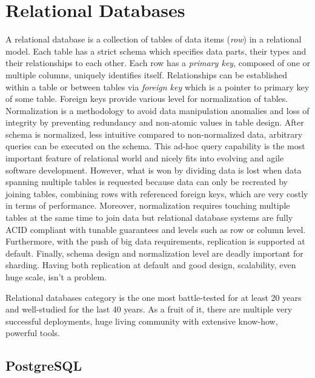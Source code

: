 \section{Relational Databases} 

A relational database is a collection of tables of data items (\textit{row}) in a relational model. Each table has a strict schema which specifies data parts, their types and their relationships to each other. Each row has a \textit{primary key}, composed of one or multiple columns, uniquely identifies itself. Relationships can be established within a table or between tables via \textit{foreign key} which is a pointer to primary key of some table. Foreign keys provide various level for normalization of tables. Normalization is a methodology to avoid data manipulation anomalies and loss of integrity by preventing redundancy and non-atomic values in table design. After schema is normalized, less intuitive compared to non-normalized data, arbitrary queries can be executed on the schema. This ad-hoc query capability is the most important feature of relational world and nicely fits into evolving and agile software development. However, what is won by dividing data is lost when data spanning multiple tables is requested because data can only be recreated by joining tables, combining rows with referenced foreign keys, which are very costly in terms of performance. Moreover, normalization requires touching multiple tables at the same time to join data but relational database systems are fully ACID compliant with tunable guarantees and levels such as row or column level. Furthermore, with the push of big data requirements, replication is supported at default. Finally, schema design and normalization level are deadly important for sharding. Having both replication at default and good design, scalability, even huge scale, isn't a problem.

Relational databases category is the one most battle-tested for at least 20 years and well-studied for the last 40 years. As a fruit of it, there are multiple very successful deployments, huge living community with extensive know-how, powerful tools.

\subsection{PostgreSQL}

